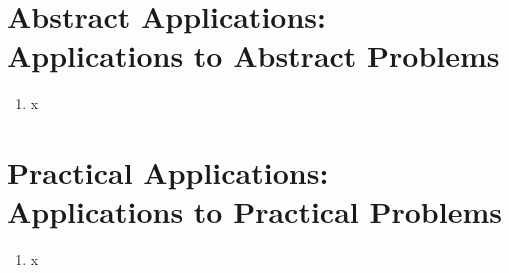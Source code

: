 \documentclass[a4paper]{article}
\begin{document}

\section{Abstract Applications: Applications to Abstract Problems}

\begin{enumerate}

\item x

\end{enumerate}


\section{Practical Applications: Applications to Practical Problems}

\begin{enumerate}

\item x

\end{enumerate}




\end{document}
